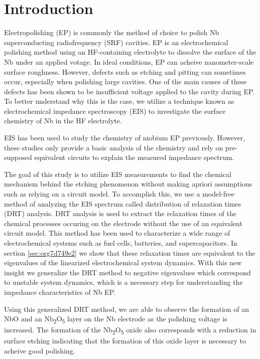 \section{Introduction}
\label{sec:org5ef967f}
Electropolishing (EP) is commonly the method of choice to polish Nb superconducting radiofrequency (SRF) cavities. EP is an electrochemical polishing method using an HF-containing electrolyte to dissolve the surface of the Nb under an applied votage. In ideal conditions, EP can acheive nanometer-scale surface roughness. However, defects such as etching and pitting can sometimes occur, especially when polishing large cavities. One of the main causes of these defects has been shown to be insufficient voltage applied to the cavity during EP.\cite{chouhan2022study,viklund2022studies,chouhan2023electropolishing} To better understand why this is the case, we utilize a technique known as electrochemical impedance spectroscopy (EIS) to investigate the surface chemistry of Nb in the HF electrolyte.

EIS has been used to study the chemistry of niobium EP previously.\cite{cattarin2002nb,Tian_2008, tian2008novel, ranjith2018anodic} However, these studies only provide a basic analysis of the chemistry and rely on pre-supposed equivalent circuits to explain the measured impedance spectrum.

The goal of this study is to utilize EIS measurements to find the chemical mechanism behind the etching phenomenon without making apriori assumptions such as relying on a circuit model. To accomplish this, we use a model-free method of analyzing the EIS spectrum called distribution of relaxation times (DRT) analysis.\cite{10.1063/1.1745355, wan2015influence, ZHANG2015464} DRT analysis is used to extract the relaxation times of the chemical processes occuring on the electrode without the use of an equivalent circuit model. This method has been used to characterize a wide range of electrochemical systems such as fuel cells,\cite{Sonn_2008, schichlein2002deconvolution, Leonide_2008} batteries,\cite{SCHMIDT201370, batteries5020043, SONI202297} and supercapacitors.\cite{HELSETH2019100912} In section \ref{sec:org7d749e2} we show that these relaxation times are equivalent to the eigenvalues of the linearized electrochemical system dynamics. With this new insight we generalize the DRT method to negative eigenvalues which correspond to unstable system dynamics, which is a necessary step for understanding the impedance characteristics of Nb EP.

Using this generalized DRT method, we are able to observe the formation of an NbO and an Nb\textsubscript{2}O\textsubscript{5} layer on the Nb electrode as the polishing voltage is increased. The formation of the Nb\textsubscript{2}O\textsubscript{5} oxide also corresponds with a reduction in surface etching indicating that the formation of this oxide layer is necessary to acheive good polishing.





